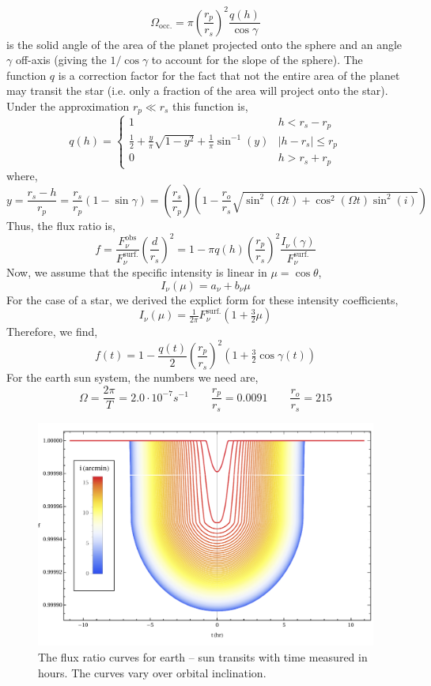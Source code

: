 \documentclass[12pt]{article}
\begin{document}
\[ \Omega_{\text{occ}.} =  \pi \left( \frac{r_p}{r_s} \right)^2 \frac{q(h)}{\cos{\gamma}} \]
is the solid angle of the area of the planet projected onto the sphere and an angle $\gamma$ off-axis (giving the $1/\cos{\gamma}$ to account for the slope of the sphere). The function $q$ is a correction factor for the fact that not the entire area of the planet may transit the star (i.e. only a fraction of the area will project onto the star). Under the approximation $r_p \ll r_s$ this function is,
\[ q(h) = \begin{cases}
1 & h < r_s - r_p
\\
\tfrac{1}{2} + \tfrac{y}{\pi} \sqrt{1 - y^2} + \tfrac{1}{\pi} \sin^{-1}(y) & |h - r_s| \le r_p
\\
0 & h > r_s + r_p
\end{cases} \]  
where,
\[ y = \frac{r_s - h}{r_p} = \frac{r_s}{r_p} \left( 1 - \sin{\gamma} \right) = \left( \frac{r_s}{r_p} \right) \left(1 - \frac{r_o}{r_s} \sqrt{\sin^2{(\Omega t)} + \cos^2{(\Omega t)} \sin^2{(i)}} \right) \]  
Thus, the flux ratio is,
\[ f = \frac{F_\nu^{\text{obs}}}{F_\nu^{\text{surf}.}} \left( \frac{d}{r_s} \right)^2 = 1 - \pi q(h) \left( \frac{r_p}{r_s} \right)^2 \frac{I_\nu (\gamma)}{F_\nu^{\text{surf}.}} \]
Now, we assume that the specific intensity is linear in $\mu = \cos{\theta}$,
\[ I_\nu(\mu) = a_\nu + b_\nu \mu \]
 For the case of a star, we derived the explict form for these intensity coefficients,
\[ I_\nu(\mu) = \tfrac{1}{2 \pi} F^{\text{surf}.}_\nu(1  + \tfrac{3}{2} \mu) \]
Therefore, we find,
\[ f(t) = 1 - \frac{q(t)}{2} \left( \frac{r_p}{r_s} \right)^2 (1 + \tfrac{3}{2} \cos{\gamma(t)}) \]
For the earth sun system, the numbers we need are,
\[ \Omega = \frac{2 \pi}{T} = 2.0 \cdot 10^{-7} s^{-1} \quad \quad \frac{r_p}{r_s} = 0.0091 \quad \quad \frac{r_o}{r_s} = 215 \]


\begin{center}
\begin{figure}
\includegraphics[width=\textwidth]{Planet_Transit_Light_Curve}
    \caption{The flux ratio curves for earth -- sun transits with time measured in hours. The curves vary over orbital inclination.}
\end{figure}
\end{center}
\end{document}
